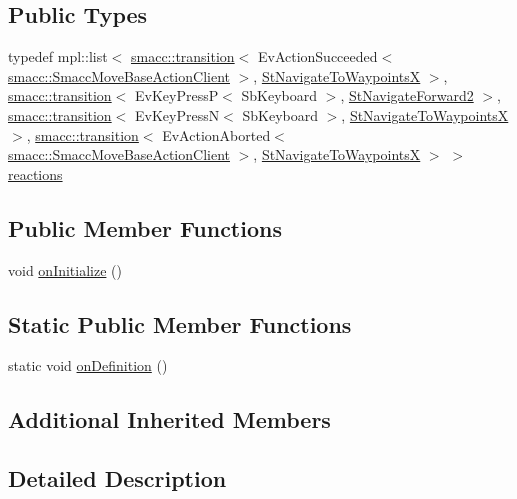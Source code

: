 \subsection*{Public Types}
\begin{DoxyCompactItemize}
\item 
typedef mpl\+::list$<$ \hyperlink{classsmacc_1_1transition}{smacc\+::transition}$<$ Ev\+Action\+Succeeded$<$ \hyperlink{classsmacc_1_1SmaccMoveBaseActionClient}{smacc\+::\+Smacc\+Move\+Base\+Action\+Client} $>$, \hyperlink{structStNavigateToWaypointsX}{St\+Navigate\+To\+WaypointsX} $>$, \hyperlink{classsmacc_1_1transition}{smacc\+::transition}$<$ Ev\+Key\+PressP$<$ Sb\+Keyboard $>$, \hyperlink{structStNavigateForward2}{St\+Navigate\+Forward2} $>$, \hyperlink{classsmacc_1_1transition}{smacc\+::transition}$<$ Ev\+Key\+PressN$<$ Sb\+Keyboard $>$, \hyperlink{structStNavigateToWaypointsX}{St\+Navigate\+To\+WaypointsX} $>$, \hyperlink{classsmacc_1_1transition}{smacc\+::transition}$<$ Ev\+Action\+Aborted$<$ \hyperlink{classsmacc_1_1SmaccMoveBaseActionClient}{smacc\+::\+Smacc\+Move\+Base\+Action\+Client} $>$, \hyperlink{structStNavigateToWaypointsX}{St\+Navigate\+To\+WaypointsX} $>$ $>$ \hyperlink{structStRotateDegrees5_a6040fbcb0f6339fd9698d12f233fabc8}{reactions}
\end{DoxyCompactItemize}
\subsection*{Public Member Functions}
\begin{DoxyCompactItemize}
\item 
void \hyperlink{structStRotateDegrees5_ae97bf7a4c7a7f270bc29642cfd4d49d3}{on\+Initialize} ()
\end{DoxyCompactItemize}
\subsection*{Static Public Member Functions}
\begin{DoxyCompactItemize}
\item 
static void \hyperlink{structStRotateDegrees5_ab6978857d7e45392f393bb9a0d6c073d}{on\+Definition} ()
\end{DoxyCompactItemize}
\subsection*{Additional Inherited Members}


\subsection{Detailed Description}


